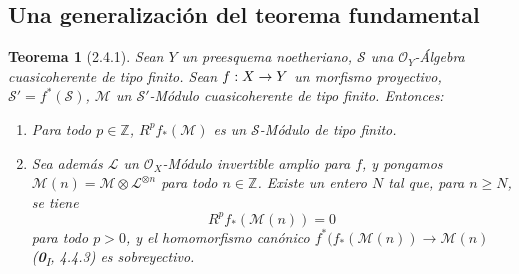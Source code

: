 \documentclass[10pt,oneside,openany]{book}
\theoremstyle{egaenv}\newtheorem*{env}{---}
\theoremstyle{egastatement}
\newtheorem*{theorem}{Teorema}
\theoremstyle{egadescription}
\renewcommand{\geq}{\geqslant}
\renewcommand{\to}{\mathchoice{\longrightarrow}{\rightarrow}{\rightarrow}{\rightarrow}}
\begin{document}
\subsection{Una generalización del teorema fundamental}
\label{subsection:III.2.4}
\label{subsection:III.2.4-fr}

\begin{theorem}[2.4.1]
\label{III.2.4.1-fr}
Sean $Y$ un preesquema noetheriano, $\mathcal S$ una
$\mathcal O_Y$-Álgebra cuasicoherente de tipo finito. Sean
$f:X\to Y$ un morfismo proyectivo, $\mathcal S'=f^*(\mathcal S)$,
$\mathcal M$ un $\mathcal S'$-Módulo cuasicoherente de tipo finito.
Entonces:
\begin{enumerate}
\item[\textup{(i)}] Para todo $p\in\mathbb Z$, $R^pf_*(\mathcal M)$ es un
$\mathcal S$-Módulo de tipo finito.
\item[\textup{(ii)}] Sea además $\mathcal L$ un $\mathcal O_X$-Módulo invertible
amplio para $f$, y pongamos
$\mathcal M(n)=\mathcal M\otimes\mathcal L^{\otimes n}$ para todo
$n\in\mathbb Z$. Existe un entero $N$ tal que, para $n\geq N$, se tiene
\[
R^pf_*(\mathcal M(n))=0
\tag{2.4.1.1}\label{III.2.4.1.1-fr}
\]
para todo $p>0$, y el homomorfismo canónico
$f^*(f_*(\mathcal M(n))\longrightarrow\mathcal M(n)$
\textup{(\textbf{0}\textsubscript{I}, 4.4.3)} es sobreyectivo.
\end{enumerate}
\end{theorem}
\end{document}
